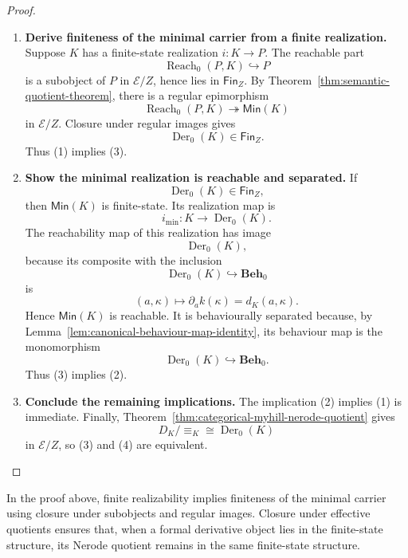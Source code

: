 \begin{proof}
    \leavevmode
    \begin{enumerate}
        \item \textbf{Derive finiteness of the minimal carrier from a finite realization.} Suppose \(K\) has a finite-state realization \(i:K\to P\). The reachable part
        \[
            \operatorname{Reach}_0(P,K)\hookrightarrow P
        \]
        is a subobject of \(P\) in \(\mathcal E/Z\), hence lies in \(\mathsf{Fin}_Z\). By Theorem~\ref{thm:semantic-quotient-theorem}, there is a regular epimorphism
        \[
            \operatorname{Reach}_0(P,K)\twoheadrightarrow\mathsf{Min}(K)
        \]
        in \(\mathcal E/Z\). Closure under regular images gives
        \[
            \operatorname{Der}_0(K)\in\mathsf{Fin}_Z.
        \]
        Thus (1) implies (3).

        \item \textbf{Show the minimal realization is reachable and separated.}
        If
        \[
            \operatorname{Der}_0(K)\in\mathsf{Fin}_Z,
        \]
        then \(\mathsf{Min}(K)\) is finite-state. Its realization map is
        \[
            i_{\min}:K\to\operatorname{Der}_0(K).
        \]
        The reachability map of this realization has image
        \[
            \operatorname{Der}_0(K),
        \]
        because its composite with the inclusion
        \[
            \operatorname{Der}_0(K)\hookrightarrow\mathbf{Beh}_0
        \]
        is
        \[
            (a,\kappa)
            \longmapsto
            \partial_a k(\kappa)
            =
            d_K(a,\kappa).
        \]
        Hence \(\mathsf{Min}(K)\) is reachable. It is behaviourally separated because, by Lemma~\ref{lem:canonical-behaviour-map-identity}, its behaviour map is the monomorphism
        \[
            \operatorname{Der}_0(K)\hookrightarrow\mathbf{Beh}_0.
        \]
        Thus (3) implies (2).

        \item \textbf{Conclude the remaining implications.} The implication (2) implies (1) is immediate. Finally, Theorem~\ref{thm:categorical-myhill-nerode-quotient} gives
        \[
            D_K/{\equiv_K}\cong\operatorname{Der}_0(K)
        \]
        in \(\mathcal E/Z\), so (3) and (4) are equivalent.
    \end{enumerate}
\end{proof}

\begin{remark}
\label{rem:finite-state-doctrine-quotients}
    In the proof above, finite realizability implies finiteness of the minimal carrier using closure under subobjects and regular images. Closure under effective quotients ensures that, when a formal derivative object lies in the finite-state structure, its Nerode quotient remains in the same finite-state structure.
\end{remark}


